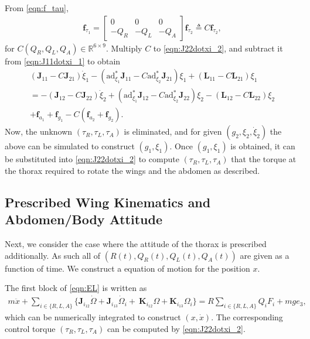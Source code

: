 \documentclass[conf]{new-aiaa}
\renewcommand{\Re}{\ensuremath{\mathbb{R}}}
\newcommand{\ad}{\ensuremath{\mathrm{ad}}}
\begin{document}
From \eqref{eqn:f_tau},
\begin{align*}
    \mathbf{f}_{\tau_1} = \begin{bmatrix} 0 & 0 & 0 \\
    -Q_R & -Q_L & -Q_A \end{bmatrix} \mathbf{f}_{\tau_2} 
    \triangleq C \mathbf{f}_{\tau_2},
\end{align*}
for $C(Q_R,Q_L,Q_A)\in\Re^{6\times 9}$. 
Multiply $C$ to \eqref{eqn:J22dotxi_2}, and subtract it from \eqref{eqn:J11dotxi_1} to obtain
\begin{gather}
    (\mathbf{J}_{11}-C\mathbf{J}_{21})\dot \xi_1 -(\ad^*_{\xi_1}\mathbf{J}_{11}-C\ad^*_{\xi_2} \mathbf{J}_{21} )\xi_1 + (\mathbf{L}_{11}-C\mathbf{L}_{21})\xi_1 \nonumber \\ 
=   - (\mathbf{J}_{12}-C\mathbf{J}_{22})\dot \xi_2 +(\ad^*_{\xi_1}\mathbf{J}_{12}-C\ad^*_{\xi_2} \mathbf{J}_{22} )\xi_2 - (\mathbf{L}_{12}-C\mathbf{L}_{22})\xi_2 \nonumber \\ 
+ \mathbf{f}_{a_1}+\mathbf{f}_{g_1}-C(\mathbf{f}_{a_2}+\mathbf{f}_{g_2}).\label{eqn:EL_xR}
\end{gather}
Now, the unknown $(\tau_R,\tau_L,\tau_A)$ is eliminated, and for given $(g_2,\xi_2,\dot\xi_2)$ the above can be simulated to construct $(g_1,\xi_1)$. 
Once $(g_1,\xi_1)$ is obtained, it can be substituted into \eqref{eqn:J22dotxi_2} to compute $(\tau_R,\tau_L,\tau_A)$ that the torque at the thorax required to rotate the wings and the abdomen as described. 

\subsection{Prescribed Wing Kinematics and Abdomen/Body Attitude}

Next, we consider the case where the attitude of the thorax is prescribed additionally. 
As such all of $(R(t),Q_R(t),Q_L(t),Q_A(t))$ are given as a function of time.
We construct a equation of motion for the position $x$. 

The first block of \eqref{eqn:EL} is written as
\begin{align}
    m\ddot x + 
    \sum_{i\in\{R,L,A\}} \big\{ \mathbf{J}_{i_{12}} \dot\Omega + \mathbf{J}_{i_{13}}\dot\Omega_i 
    + \ \mathbf{K}_{i_{12}}\Omega + \mathbf{K}_{i_{13}}\Omega_i \big\} = R\sum_{i\in\{R,L,A\}} Q_i F_i + mg e_3,\label{eqn:mx_ddot}
\end{align}
which can be numerically integrated to construct $(x,\dot x)$. 
The corresponding control torque $(\tau_R,\tau_L,\tau_A)$ can be computed by \eqref{eqn:J22dotxi_2}.
\end{document}
